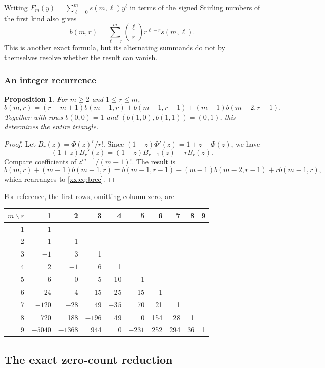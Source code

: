 \documentclass[11pt,a4paper]{article}
\numberwithin{equation}{section}
\newtheorem{proposition}[theorem]{Proposition}
\theoremstyle{definition}
\theoremstyle{remark}
\theoremstyle{plain}
\begin{document}
Writing $F_m(y)=\sum_{\ell=0}^m s(m,\ell)y^\ell$ in terms of the signed
Stirling numbers of the first kind also gives
\begin{equation}\label{xx:eq:stirling}
 b(m,r)=\sum_{\ell=r}^m\binom\ell r r^{\ell-r}s(m,\ell).
\end{equation}
This is another exact formula, but its alternating summands do not by
themselves resolve whether the result can vanish.

\subsubsection{An integer recurrence}
\begin{proposition}\label{xx:prop:brec}
For $m\ge2$ and $1\le r\le m$,
\begin{equation}\label{xx:eq:brec}
 b(m,r)=(r-m+1)b(m-1,r)+b(m-1,r-1)+(m-1)b(m-2,r-1).
\end{equation}
Together with rows $b(0,0)=1$ and $(b(1,0),b(1,1))=(0,1)$, this determines
the entire triangle.
\end{proposition}
\begin{proof}
Let $B_r(z)=\Phi(z)^r/r!$. Since
$(1+z)\Phi'(z)=1+z+\Phi(z)$, we have
\[
 (1+z)B_r'(z)=(1+z)B_{r-1}(z)+rB_r(z).
\]
Compare coefficients of $z^{m-1}/(m-1)!$. The result is
\[
 b(m,r)+(m-1)b(m-1,r)
 =b(m-1,r-1)+(m-1)b(m-2,r-1)+r b(m-1,r),
\]
which rearranges to \eqref{xx:eq:brec}.
\end{proof}

For reference, the first rows, omitting column zero, are
\begin{center}
\setlength{\tabcolsep}{4pt}
\small
\begin{tabular}{r|rrrrrrrrr}
$m\backslash r$&1&2&3&4&5&6&7&8&9\\\hline
1&1\\
2&1&1\\
3&$-1$&3&1\\
4&2&$-1$&6&1\\
5&$-6$&0&5&10&1\\
6&24&4&$-15$&25&15&1\\
7&$-120$&$-28$&49&$-35$&70&21&1\\
8&720&188&$-196$&49&0&154&28&1\\
9&$-5040$&$-1368$&944&0&$-231$&252&294&36&1
\end{tabular}
\end{center}

\subsection{The exact zero-count reduction}
\end{document}
